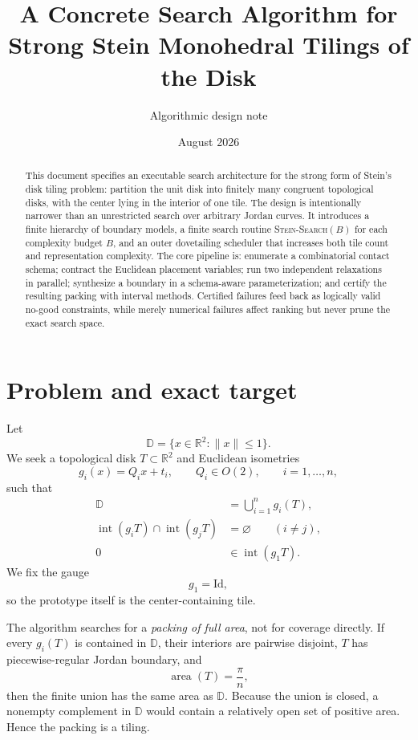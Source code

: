 \documentclass[11pt]{article}
\title{A Concrete Search Algorithm for Strong Stein Monohedral Tilings of the Disk}
\author{Algorithmic design note}
\date{August 2026}
\newcommand{\D}{\mathbb D}
\newcommand{\R}{\mathbb R}
\newcommand{\area}{\operatorname{area}}
\newcommand{\interior}{\operatorname{int}}
\newcommand{\Id}{\mathrm{Id}}
\begin{document}
\maketitle

\begin{abstract}
This document specifies an executable search architecture for the strong form of Stein's disk tiling problem: partition the unit disk into finitely many congruent topological disks, with the center lying in the interior of one tile. The design is intentionally narrower than an unrestricted search over arbitrary Jordan curves. It introduces a finite hierarchy of boundary models, a finite search routine \textsc{Stein-Search}$(B)$ for each complexity budget $B$, and an outer dovetailing scheduler that increases both tile count and representation complexity. The core pipeline is: enumerate a combinatorial contact schema; contract the Euclidean placement variables; run two independent relaxations in parallel; synthesize a boundary in a schema-aware parameterization; and certify the resulting packing with interval methods. Certified failures feed back as logically valid no-good constraints, while merely numerical failures affect ranking but never prune the exact search space.
\end{abstract}

\section{Problem and exact target}

Let
\[
\D=\{x\in\R^2:\|x\|\le 1\}.
\]
We seek a topological disk $T\subset\R^2$ and Euclidean isometries
\[
 g_i(x)=Q_i x+t_i,\qquad Q_i\in O(2),\qquad i=1,\ldots,n,
\]
such that
\begin{align}
\D &= \bigcup_{i=1}^n g_i(T), \\
\interior(g_iT)\cap\interior(g_jT)&=\varnothing\qquad(i\ne j), \\
0&\in\interior(g_1T).
\end{align}
We fix the gauge
\[
g_1=\Id,
\]
so the prototype itself is the center-containing tile.

The algorithm searches for a \emph{packing of full area}, not for coverage directly. If every $g_i(T)$ is contained in $\D$, their interiors are pairwise disjoint, $T$ has piecewise-regular Jordan boundary, and
\[
\area(T)=\frac{\pi}{n},
\]
then the finite union has the same area as $\D$. Because the union is closed, a nonempty complement in $\D$ would contain a relatively open set of positive area. Hence the packing is a tiling.
\end{document}
